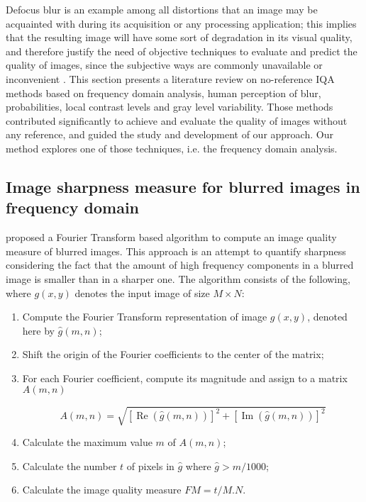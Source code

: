 Defocus blur is an example among all distortions that an image may be acquainted with during its acquisition or any processing application; this implies that the resulting image will have some sort of degradation in its visual quality, and therefore justify the need of objective techniques to evaluate and predict the quality of images, since the subjective ways are commonly unavailable or inconvenient \cite{wang2004image}. This section presents a literature review on no-reference IQA methods based on frequency domain analysis, human perception of blur, probabilities, local contrast levels and gray level variability. Those methods contributed significantly to achieve and evaluate the quality of images without any reference, and guided the study and development of our approach. Our method explores one of those techniques, i.e. the frequency domain analysis.

\subsection{Image sharpness measure for blurred images in frequency domain}

 proposed a Fourier Transform based algorithm to compute an image quality measure of blurred images. This approach is an attempt to quantify sharpness considering the fact that the amount of high frequency components in a blurred image is smaller than in a sharper one. The algorithm consists of the following, where $g(x,y)$ denotes the input image of size $M \times N$:

\begin{enumerate}[label=\Roman* -]
    \item Compute the Fourier Transform representation of image $g(x,y)$, denoted here by $\hat{g}(m,n)$;
    
    \item Shift the origin of the Fourier coefficients to the center of the matrix;
    
    \item For each Fourier coefficient, compute its magnitude and assign to a matrix $A(m,n)$
    
    \begin{equation*}
        A(m,n) = \sqrt{
            [\operatorname{Re}{(\hat{g}(m,n))}]^{2}
            + [\operatorname{Im}{(\hat{g}(m,n))}]^{2}
          }
    \end{equation*}
    
    \item  Calculate the maximum value $m$ of $A(m,n)$; 
    
    \item Calculate the number $t$ of pixels in $\hat{g}$ where $\hat{g} > m /1000$;
    
    \item Calculate the image quality measure $FM = t /M.N$.
\end{enumerate}

